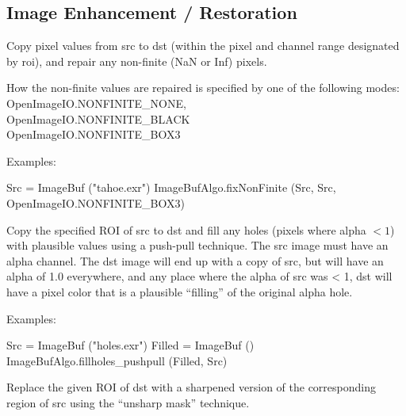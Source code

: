 \subsection{Image Enhancement / Restoration}
\label{sec:iba:py:enhance}

 

Copy pixel values from {\cf src} to {\cf dst} (within the pixel and channel
range designated by {\cf roi}), and repair any non-finite ({\cf NaN} or {\cf
Inf}) pixels.

How the non-finite values are repaired is specified by one of the
following modes: \\
{\cf OpenImageIO.NONFINITE_NONE}, \\
{\cf OpenImageIO.NONFINITE_BLACK} \\ 
{\cf OpenImageIO.NONFINITE_BOX3}

\smallskip
\noindent Examples:
\begin{code}
    Src = ImageBuf ("tahoe.exr")
    ImageBufAlgo.fixNonFinite (Src, Src, OpenImageIO.NONFINITE_BOX3)
\end{code}
\apiend


 
Copy the specified ROI of {\cf src} to {\cf dst} and fill any 
holes (pixels where alpha $< 1$) with plausible values using a push-pull
technique.  The {\cf src} image must have
an alpha channel.  The dst image will end up with a copy of src, but
will have an alpha of 1.0 everywhere, and any place where the alpha
of src was < 1, dst will have a pixel color that is a plausible
``filling'' of the original alpha hole.

\smallskip
\noindent Examples:
\begin{code}
    Src = ImageBuf ("holes.exr")
    Filled = ImageBuf ()
    ImageBufAlgo.fillholes_pushpull (Filled, Src)
\end{code}
\apiend


 


Replace the given ROI of {\cf dst} with a sharpened version of the
corresponding region of {\cf src} using the ``unsharp mask'' technique.

